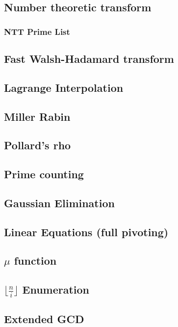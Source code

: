 \documentclass[a4paper,10pt,twocolumn,oneside]{article}
\begin{document}
\subsection{Number theoretic transform}

\subsubsection{NTT Prime List}

\subsection{Fast Walsh-Hadamard transform}

\subsection{Lagrange Interpolation}

\subsection{Miller Rabin}

\subsection{Pollard's rho}

\subsection{Prime counting}

\subsection{Gaussian Elimination}

\subsection{Linear Equations (full pivoting)}

\subsection{$\mu$ function}

\subsection{$\lfloor \frac{n}{i} \rfloor$ Enumeration}

\subsection{Extended GCD}

\end{document}
